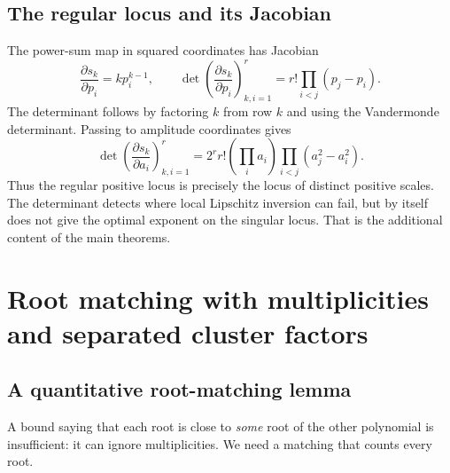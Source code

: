 \documentclass[11pt,a4paper]{article}
\numberwithin{equation}{section}
\theoremstyle{definition}
\theoremstyle{remark}
\begin{document}
\subsection{The regular locus and its Jacobian}
The power-sum map in squared coordinates has Jacobian
\begin{equation}
 \frac{\partial s_k}{\partial p_i}=kp_i^{k-1},\qquad
 \det\left(\frac{\partial s_k}{\partial p_i}\right)_{k,i=1}^r
 =r!\prod_{i<j}(p_j-p_i).
 \label{eq:jacobian-p}
\end{equation}
The determinant follows by factoring $k$ from row $k$ and using the Vandermonde
determinant.  Passing to amplitude coordinates gives
\begin{equation}
 \det\left(\frac{\partial s_k}{\partial a_i}\right)_{k,i=1}^r
 =2^rr!\left(\prod_i a_i\right)\prod_{i<j}(a_j^2-a_i^2).
 \label{eq:jacobian-a}
\end{equation}
Thus the regular positive locus is precisely the locus of distinct positive
scales.  The determinant detects where local Lipschitz inversion can fail, but
by itself does not give the optimal exponent on the singular locus.  That is
the additional content of the main theorems.

\section{Root matching with multiplicities and separated cluster factors}
\label{sec:roots}

\subsection{A quantitative root-matching lemma}
A bound saying that each root is close to \emph{some} root of the other polynomial
is insufficient: it can ignore multiplicities.  We need a matching that counts
every root.
\end{document}
